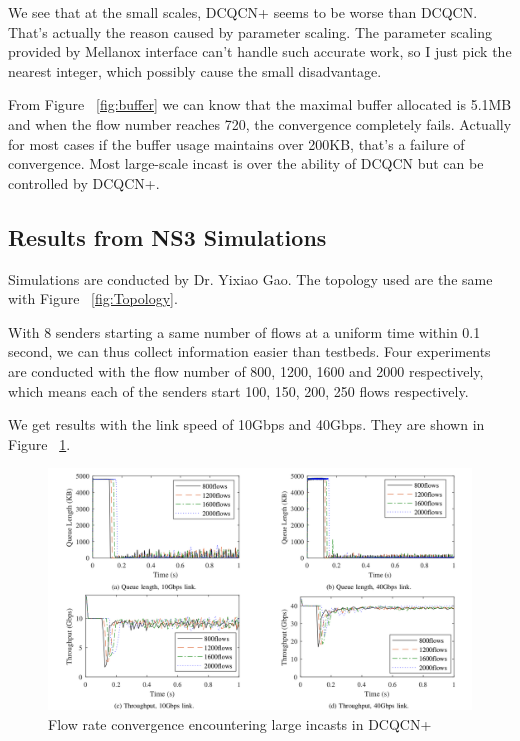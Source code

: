 \documentclass[12pt,a4paper]{article}
\begin{document}
We see that at the small scales, DCQCN+ seems to be worse than DCQCN.
That's actually the reason caused by parameter scaling.
The parameter scaling provided by Mellanox interface can't handle such accurate work, so I just pick the nearest integer,
which possibly cause the small disadvantage.

From Figure ~\ref{fig:buffer} we can know that the maximal buffer allocated is 5.1MB and when the flow number reaches 720,
the convergence completely fails.
Actually for most cases if the buffer usage maintains over 200KB, that's a failure of convergence.
Most large-scale incast is over the ability of DCQCN but can be controlled by DCQCN+.

\subsection{Results from NS3 Simulations}

Simulations are conducted by Dr. Yixiao Gao. The topology used are the same with Figure ~\ref{fig:Topology}.

With 8 senders starting a same number of flows at a uniform time within 0.1 second,
we can thus collect information easier than testbeds.
Four experiments are conducted with the flow number of 800, 1200, 1600 and 2000 respectively,
which means each of the senders start 100, 150, 200, 250 flows respectively.

We get results with the link speed of 10Gbps and 40Gbps.
They are shown in Figure ~\ref{fig:simulation}.

\begin{figure}[ht]
	\begin{center}
		\includegraphics[width=6in]{simulation}
		\caption{Flow rate convergence encountering large incasts in DCQCN+}
		\label{fig:simulation}
	\end{center}
\end{figure}
\end{document}
